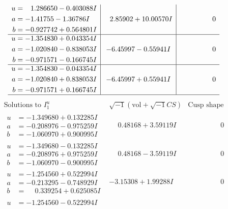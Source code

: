 \documentclass[1p]{elsarticle_modified}
\theoremstyle{definition}
\newcommand{\I}{\sqrt{-1}}
\begin{document}
$$\begin{array}{c|c|c}
\begin{aligned}
u &= \phantom{-}1.286650 - 0.403088 I \\
a &= -1.41755 - 1.36786 I \\
b &= -0.927742 + 0.564801 I\end{aligned}
 & \phantom{-}2.85902 + 10.00570 I & \phantom{-0.000000 } 0 \\ \hline\begin{aligned}
u &= -1.354830 + 0.043354 I \\
a &= -1.020840 - 0.838053 I \\
b &= -0.971571 - 0.166745 I\end{aligned}
 & -6.45997 - 0.55941 I & \phantom{-0.000000 } 0 \\ \hline\begin{aligned}
u &= -1.354830 - 0.043354 I \\
a &= -1.020840 + 0.838053 I \\
b &= -0.971571 + 0.166745 I\end{aligned}
 & -6.45997 + 0.55941 I & \phantom{-0.000000 } 0\\
 \hline 
 \end{array}$$\newpage$$\begin{array}{c|c|c}  
\text{Solutions to }I^u_{1}& \I (\text{vol} + \sqrt{-1}CS) & \text{Cusp shape}\\
 \hline 
\begin{aligned}
u &= -1.349680 + 0.132285 I \\
a &= -0.208976 - 0.975259 I \\
b &= -1.060970 + 0.900995 I\end{aligned}
 & \phantom{-}0.48168 + 3.59119 I & \phantom{-0.000000 } 0 \\ \hline\begin{aligned}
u &= -1.349680 - 0.132285 I \\
a &= -0.208976 + 0.975259 I \\
b &= -1.060970 - 0.900995 I\end{aligned}
 & \phantom{-}0.48168 - 3.59119 I & \phantom{-0.000000 } 0 \\ \hline\begin{aligned}
u &= -1.254560 + 0.522994 I \\
a &= -0.213295 - 0.748929 I \\
b &= \phantom{-}0.339254 + 0.625085 I\end{aligned}
 & -3.15308 + 1.99288 I & \phantom{-0.000000 } 0 \\ \hline\begin{aligned}
u &= -1.254560 - 0.522994 I \\

\end{aligned}
\end{array}$$
\end{document}
